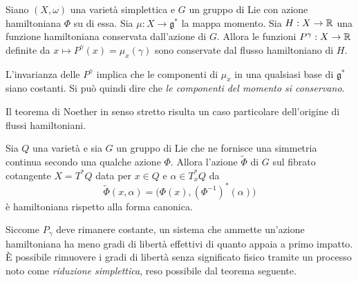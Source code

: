 \begin{theorem}
  Siano $(X,\omega)$ una varietà simplettica e $G$ un gruppo di Lie con azione hamiltoniana $\Phi$ su di essa. Sia $\mu: X\to \mathfrak{g}^*$ la mappa momento. Sia $H: X\to \mathbb{R}$ una funzione hamiltoniana conservata dall'azione di $G$. Allora le funzioni $P^{\gamma}: X\to \mathbb{R}$ definite da $x \mapsto P^{\gamma}(x) = \mu_x(\gamma)$ sono conservate dal flusso hamiltoniano di $H$.
\end{theorem}
\begin{remark}
  L'invarianza delle $P^{\gamma}$ implica che le componenti di $\mu_x$ in una qualsiasi base di $\mathfrak{g}^*$ siano costanti. Si può quindi dire che \emph{le componenti del momento si conservano}. 
\end{remark}

Il teorema di Noether in senso stretto risulta un caso particolare dell'origine di flussi hamiltoniani.
\begin{theorem}
  Sia $Q$ una varietà e sia $G$ un gruppo di Lie che ne fornisce una simmetria continua secondo una qualche azione $\Phi$. Allora l'azione $\tilde{\Phi}$ di $G$ sul fibrato cotangente $X=T^*Q$ data per $x \in Q$ e $\alpha \in T^*_x Q$ da
  \begin{equation*}
  \tilde{\Phi}(x,\alpha) = \big(\Phi(x), (\Phi^{-1})^*(\alpha)\big)
  \end{equation*} 
  è hamiltoniana rispetto alla forma canonica.
\end{theorem}

Siccome $P_\gamma$ deve rimanere costante, un sistema che ammette un'azione hamiltoniana ha meno gradi di libertà effettivi di quanto appaia a primo impatto. È possibile rimuovere i gradi di libertà senza significato fisico tramite un processo noto come \emph{riduzione simplettica}, reso possibile dal teorema seguente.

